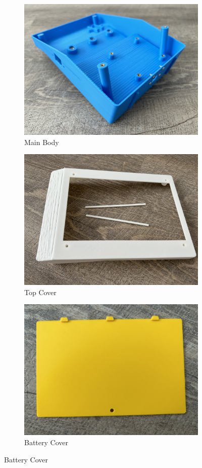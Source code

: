 \begin{figure}[h!]
    \centering
    \begin{subfigure}[c]{0.45\textwidth}
        \begin{minipage}{\textwidth}
            \centering
            \includegraphics[height=4 cm]{texs/Part1/chapter5/image/res_main.jpg}
        \end{minipage}
        \caption{Main Body}
        \label{fig:printed_main_body}
    \end{subfigure}
    \begin{subfigure}[c]{0.45\textwidth}
        \begin{minipage}{\textwidth}
            \centering
            \includegraphics[height=4 cm]{texs/Part1/chapter5/image/res_top.jpg}
        \end{minipage}
        \caption{Top Cover}
        \label{fig:printed_top_cover}
    \end{subfigure}
    \begin{subfigure}[c]{0.45\textwidth}
        \begin{minipage}{\textwidth}
            \centering
            \includegraphics[height=4 cm]{texs/Part1/chapter5/image/res_batt.jpg}
        \end{minipage}
        \caption{Battery Cover}

\end{subfigure}
\end{figure}
